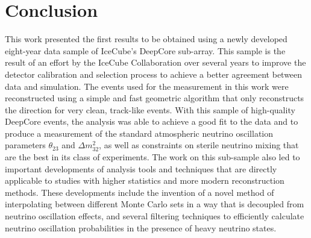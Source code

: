 \chapter{Conclusion}

This work presented the first results to be obtained using a newly developed eight-year data sample of IceCube's DeepCore sub-array. This sample is the result of an effort by the IceCube Collaboration over several years to improve the detector calibration and selection process to achieve a better agreement between data and simulation. The events used for the measurement in this work were reconstructed using a simple and fast geometric algorithm that only reconstructs the direction for very clean, track-like events. With this  sample of high-quality DeepCore events, the analysis was able to achieve a good fit to the data and to produce a measurement of the standard atmospheric neutrino oscillation parameters $\theta_{23}$ and $\Delta m^2_{32}$, as well as constraints on sterile neutrino mixing that are the best in its class of experiments. The work on this sub-sample also led to important developments of analysis tools and techniques that are directly applicable to studies with higher statistics and more modern reconstruction methods. These developments include the invention of a novel method of interpolating between different Monte Carlo sets in a way that is decoupled from neutrino oscillation effects, and several filtering techniques to efficiently calculate neutrino oscillation probabilities in the presence of heavy neutrino states.


